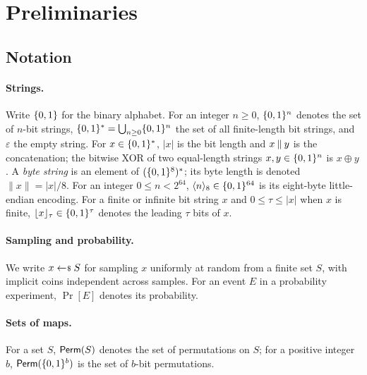 \section{Preliminaries}
\label{sec:prelims}

\subsection{Notation}
\label{sec:notation}

\paragraph{Strings.}
Write $\{0,1\}$ for the binary alphabet. For an integer $n \geq 0$, $\{0,1\}^n$
denotes the set of $n$-bit strings, $\{0,1\}^* = \bigcup_{n \geq 0} \{0,1\}^n$
the set of all finite-length bit strings, and $\varepsilon$ the empty
string. For $x \in \{0,1\}^*$, $|x|$ is the bit length and $x \mathbin{\|} y$ is
the concatenation; the bitwise XOR of two equal-length strings $x, y \in
\{0,1\}^n$ is $x \oplus y$. A \emph{byte string} is an element of
$(\{0,1\}^8)^*$; its byte length is denoted $\|x\| = |x|/8$. For an
integer $0 \leq n < 2^{64}$, $\langle n \rangle_8 \in \{0,1\}^{64}$ is its
eight-byte little-endian encoding. For a finite or infinite bit string
$x$ and $0 \leq \tau \leq |x|$ when $x$ is finite,
$\lfloor x \rfloor_\tau \in \{0,1\}^\tau$ denotes the leading $\tau$ bits
of $x$.

\paragraph{Sampling and probability.}
We write $x \sample S$ for sampling $x$ uniformly at random from a finite
set $S$, with implicit coins independent across samples. For an event $E$
in a probability experiment, $\Pr[E]$ denotes its probability.

\paragraph{Sets of maps.}
For a set $S$, $\mathsf{Perm}(S)$ denotes the set of permutations on $S$; for a
positive integer $b$, $\mathsf{Perm}(\{0,1\}^b)$ is the set of $b$-bit
permutations.

